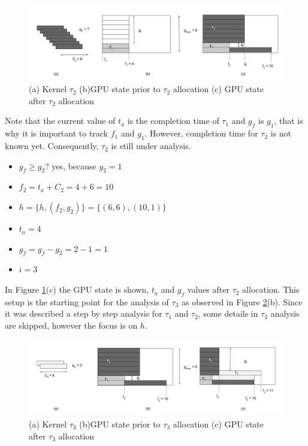 \documentclass[
  12pt,
  a4paperpaper,
]{report}
\providecommand{\tightlist}{%
  \setlength{\itemsep}{0pt}\setlength{\parskip}{0pt}}
\begin{document}
\begin{figure}
\centering
\includegraphics{source/figures/ex_2.jpg}
\caption{(a) Kernel \(\tau_2\) (b)GPU state prior to \(\tau_2\)
allocation (c) GPU state after \(\tau_2\) allocation \label{img:ex_2}}
\end{figure}

Note that the current value of \(t_a\) is the completion time of \(\tau_1\) and
\(g_f\) is \(g_1\), that is why it is important to
track \(f_1\) and \(g_1\). However, completion time for \(\tau_2\) is
not known yet. Consequently, \(\tau_2\) is still under analysis.

\begin{itemize}
\tightlist
\item
  \(g_f \geq g_2\)? yes, because \(g_2 = 1\)
\item
  \(f_2 = t_a + C_2 = 4 + 6 = 10\)
\item
  \(h = \{h, (f_2, g_2)\} = \{ (6,6),(10,1) \}\)
\item
  \(t_a = 4\)
\item
  \(g_f = g_f - g_2 = 2 - 1 = 1\)
\item
  \(i = 3\)
\end{itemize}

In Figure \ref{img:ex_2}(c) the GPU state is shown, \(t_a\) and \(g_f\)
values after \(\tau_2\) allocation. This setup is the starting point for
the analysis of \(\tau_3\) as observed in Figure \ref{img:ex_3}(b).
Since it was described a step by step analysis for \(\tau_1\) and
\(\tau_2\), some details in \(\tau_3\) analysis are skipped, however the focus is on \(h\).

\begin{figure}
\centering
\includegraphics{source/figures/ex_3.jpg}
\caption{(a) Kernel \(\tau_3\) (b)GPU state prior to \(\tau_3\)
allocation (c) GPU state after \(\tau_3\) allocation \label{img:ex_3}}
\end{figure}
\end{document}
